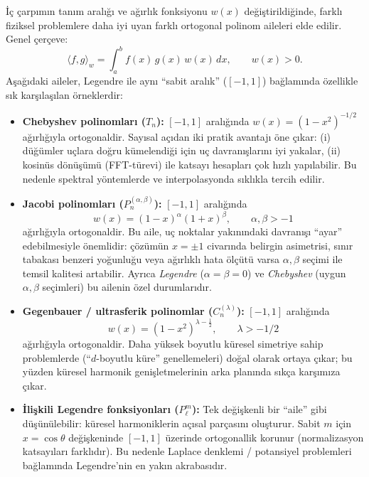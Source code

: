 İç çarpımın tanım aralığı ve ağırlık fonksiyonu $w(x)$ değiştirildiğinde,
farklı fiziksel problemlere daha iyi uyan farklı ortogonal polinom aileleri elde edilir.
Genel çerçeve:
\[
\langle f,g\rangle_w=\int_a^b f(x)\,g(x)\,w(x)\,dx, \qquad w(x)>0.
\]
Aşağıdaki aileler, Legendre ile aynı ``sabit aralık'' ($[-1,1]$) bağlamında özellikle sık karşılaşılan örneklerdir:
\begin{itemize}
    \item \textbf{Chebyshev polinomları ($T_n$):}
    $[-1,1]$ aralığında $w(x)=(1-x^2)^{-1/2}$ ağırlığıyla ortogonaldir.
    Sayısal açıdan iki pratik avantajı öne çıkar:
    (i) düğümler uçlara doğru kümelendiği için uç davranışlarını iyi yakalar,
    (ii) kosinüs dönüşümü (FFT-türevi) ile katsayı hesapları çok hızlı yapılabilir.
    Bu nedenle spektral yöntemlerde ve interpolasyonda sıklıkla tercih edilir.

    \item \textbf{Jacobi polinomları ($P_n^{(\alpha,\beta)}$):}
    $[-1,1]$ aralığında
    \[
      w(x)=(1-x)^{\alpha}(1+x)^{\beta}, \qquad \alpha,\beta>-1
    \]
    ağırlığıyla ortogonaldir.
    Bu aile, uç noktalar yakınındaki davranışı ``ayar'' edebilmesiyle önemlidir:
    çözümün $x=\pm 1$ civarında belirgin asimetrisi, sınır tabakası benzeri yoğunluğu
    veya ağırlıklı hata ölçütü varsa $\alpha,\beta$ seçimi ile temsil kalitesi artabilir.
    Ayrıca \emph{Legendre} ($\alpha=\beta=0$) ve \emph{Chebyshev} (uygun $\alpha,\beta$ seçimleri) bu ailenin özel durumlarıdır.

    \item \textbf{Gegenbauer / ultrasferik polinomlar ($C_n^{(\lambda)}$):}
    $[-1,1]$ aralığında
    \[
      w(x)=(1-x^2)^{\lambda-\tfrac12}, \qquad \lambda>-1/2
    \]
    ağırlığıyla ortogonaldir.
    Daha yüksek boyutlu küresel simetriye sahip problemlerde (``$d$-boyutlu küre'' genellemeleri)
    doğal olarak ortaya çıkar; bu yüzden küresel harmonik genişletmelerinin arka planında
    sıkça karşımıza çıkar.

    \item \textbf{İlişkili Legendre fonksiyonları ($P_\ell^m$):}
    Tek değişkenli bir ``aile'' gibi düşünülebilir: küresel harmoniklerin açısal parçasını oluşturur.
    Sabit $m$ için $x=\cos\theta$ değişkeninde $[-1,1]$ üzerinde ortogonallik korunur
    (normalizasyon katsayıları farklıdır).
    Bu nedenle Laplace denklemi / potansiyel problemleri bağlamında Legendre'nin en yakın akrabasıdır.
\end{itemize}

